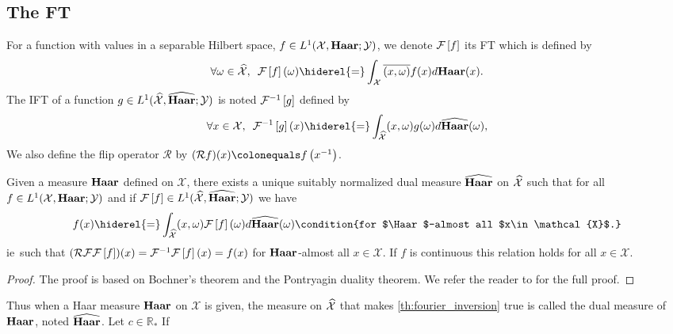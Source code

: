 \subsection[The Fourier Transform]{The \acl{FT}}
For a function with values in a separable Hilbert space, $f\in
L^1(\mathcal{X},\mathbf{Haar};\mathcal{Y})$, we denote $\mathcal{F}\left[f\right]$ its \acf{FT} which is
defined by
\begin{dmath*}
        \forall \omega \in \dual{\mathcal{X}},\enskip \FT{f}(\omega)
        \hiderel{=}\int_{\mathcal{X}} \conj{\pairing{x,\omega}}f(x)d\Haar(x).
\end{dmath*}
The \acf{IFT} of a function $g\in L^1(\widehat{\mathcal{X}},\widehat{\mathbf{Haar}};
\mathcal{Y})$ is noted $\mathcal{F}^{-1}\left[g\right]$ defined by
\begin{dmath*}
    \forall x \in \mathcal{X},\enskip \IFT{g}(x)
    \hiderel{=}\int_{\dual{\mathcal{X}}} \pairing{x,\omega}g(\omega)
    d\dual{\Haar}(\omega),
\end{dmath*}
We also define the flip operator $\mathcal{R}$ by $(\mathcal{R}f)(x)
\colonequals f\left(\inv{x}\right)$.
\begin{theorem}
    \label{th:fourier_inversion} Given a measure $\Haar$ defined on
    $\mathcal{X}$, there exists a unique suitably normalized dual measure
    $\widehat{\mathbf{Haar}}$ on $\widehat{\mathcal{X}}$ such that for all $f \in
    L^1(\mathcal{X}, \mathbf{Haar};\mathcal{Y})$ and if $\mathcal{F}\left[f\right] \in
    L^1(\widehat{\mathcal{X}}, \widehat{\mathbf{Haar}}; \mathcal{Y})$ we have
    \begin{dmath}
        \label{fourier-l1} f(x) \hiderel{=} \int_{\dual{\mathcal{X}}}
        \pairing{x, \omega} \FT{f}(\omega) d\dual{\Haar}(\omega) \condition{for
        $\Haar$-almost all $x\in \mathcal{X}$.}
    \end{dmath}
    \acs{ie}~such that
    $(\mathcal{R}\mathcal{F}\mathcal{F}\left[f\right])(x)=\mathcal{F}^{-1}\mathcal{F}\left[f\right](x)=f(x)$ for
    $\Haar$-almost all $x\in\mathcal{X}$. If $f$ is continuous this relation
    holds for all $x\in\mathcal{X}$.
\end{theorem}
\begin{proof}
    The proof is based on Bochner's theorem and the Pontryagin duality theorem.
    We refer the reader to \citet[theorem~4.22 page~105 and theorem~4.33
    page~111]{folland1994course} for the full proof.
\end{proof}
Thus when a Haar measure $\Haar$ on $\mathcal{X}$ is given, the measure on
$\widehat{\mathcal{X}}$ that makes \cref{th:fourier_inversion} true is called the
dual measure of $\Haar$, noted $\widehat{\mathbf{Haar}}$. Let $c\in\mathbb{R}_*$ If

